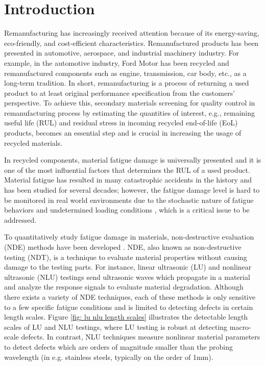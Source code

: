 \chapter{Introduction}
\label{chap: intro}
Remanufacturing has increasingly received attention because of its energy-saving, eco-friendly, and cost-efficient characteristics. Remanufactured products has been presented in automotive, aerospace, and industrial machinery industry. For example, in the automotive industry, Ford Motor has been recycled and remanufactured components such as engine, transmission, car body, etc., as a long-term tradition. In short, remanufacturing is a process of returning a used product to at least original performance specification from the customers’ perspective. To achieve this, secondary materials screening for quality control in remanufacturing process by estimating the quantities of interest, e.g., remaining useful life (RUL) and residual stress in incoming recycled end-of-life (EoL) products, becomes an essential step and is crucial in increasing the usage of recycled materials.

In recycled components, material fatigue damage is universally presented and it is one of the most influential factors that determines the RUL of a used product. Material fatigue has resulted in many catastrophic accidents in the history and has been studied for several decades; however, the fatigue damage level is hard to be monitored in real world environments due to the stochastic nature of fatigue behaviors and undetermined loading conditions \cite{fatigue-review-Santecchia2016}, which is a critical issue to be addressed.

To quantitatively study fatigue damage in materials, non-destructive evaluation (NDE) methods have been developed \cite{nde-review-WISNER2020}. NDE, also known as non-destructive testing (NDT), is a technique to evaluate material properties without causing damage to the testing parts. For instance, linear ultrasonic (LU) and nonlinear ultrasonic (NLU) testings send ultrasonic waves which propagate in a material and analyze the response signals to evaluate material degradation. Although there exists a variety of NDE techniques, each of these methods is only sensitive to a few specific fatigue conditions and is limited to detecting defects in certain length scales. Figure \ref{fig: lu nlu length scales} illustrates the detectable length scales of LU and NLU testings, where LU testing is robust at detecting macro-scale defects. In contrast, NLU techniques measure nonlinear material parameters to detect defects which are orders of magnitude smaller than the probing wavelength (in e.g. stainless steels, typically on the order of 1mm).

